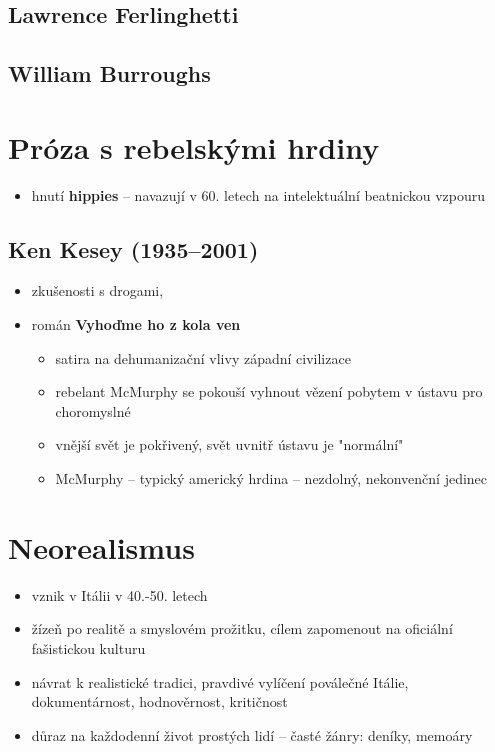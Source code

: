 \subsection{Lawrence Ferlinghetti}
\subsection{William Burroughs}

\section{Próza s rebelskými hrdiny}
\begin{itemize}
\item hnutí \textbf{hippies} -- navazují v 60. letech na intelektuální beatnickou vzpouru
\end{itemize}

\subsection{Ken Kesey (1935--2001)}
\begin{itemize}
\item zkušenosti s drogami, 
\item román \textbf{Vyhoďme ho z kola ven}
\begin{itemize}
\item satira na dehumanizační vlivy západní civilizace
\item rebelant McMurphy se pokouší vyhnout vězení pobytem v ústavu pro choromyslné
\item vnější svět je pokřivený, svět uvnitř ústavu je "normální"
\item McMurphy -- typický americký hrdina -- nezdolný, nekonvenční jedinec
\end{itemize}
\end{itemize}



\section{Neorealismus}
\begin{itemize}
\item vznik v Itálii v  40.-50. letech
\item žízeň po realitě a smyslovém prožitku, cílem zapomenout na oficiální fašistickou kulturu
\item návrat k realistické tradici, pravdivé vylíčení poválečné Itálie, dokumentárnost, hodnověrnost, kritičnost
\item důraz na každodenní život prostých lidí -- časté žánry: deníky, memoáry
\end{itemize}


